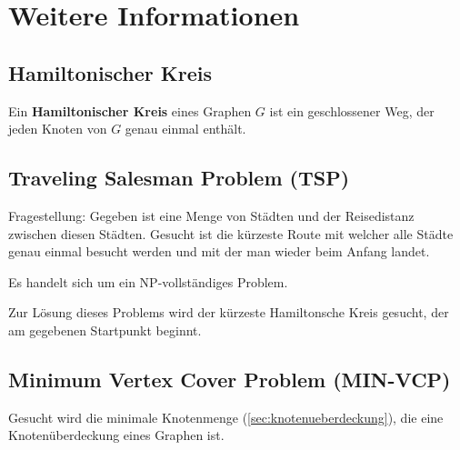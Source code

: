 \chapter{Weitere Informationen}
\section{Hamiltonischer Kreis}
Ein \textbf{Hamiltonischer Kreis} eines Graphen $G$ ist ein geschlossener Weg, der jeden Knoten von $G$ genau einmal enthält.

\section{Traveling Salesman Problem (TSP)}
Fragestellung: Gegeben ist eine Menge von Städten und der Reisedistanz zwischen diesen Städten. Gesucht ist die kürzeste Route mit welcher alle Städte genau einmal besucht werden und mit der man wieder beim Anfang landet.

Es handelt sich um ein NP-vollständiges Problem.

Zur Lösung dieses Problems wird der kürzeste Hamiltonsche Kreis gesucht, der am gegebenen Startpunkt beginnt.

\section{Minimum Vertex Cover Problem (MIN-VCP)}
Gesucht wird die minimale Knotenmenge (\ref{sec:knotenueberdeckung}), die eine Knotenüberdeckung eines Graphen ist.